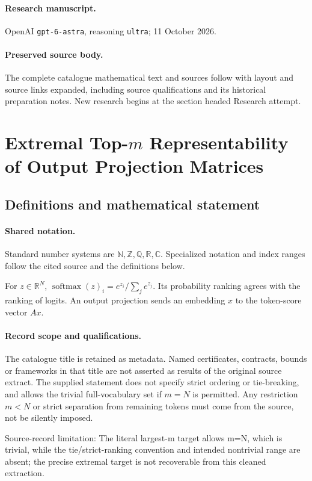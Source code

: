 \documentclass[11pt]{article}
\begin{document}
\paragraph{Research manuscript.} OpenAI \texttt{gpt-6-astra}, reasoning \texttt{ultra}; 11 October 2026.
\paragraph{Preserved source body.} The complete catalogue mathematical text and sources follow with layout and source links expanded, including source qualifications and its historical preparation notes. New research begins at the section headed Research attempt.

\section{Extremal Top-$m$ Representability of Output Projection Matrices}\label{statement}

\subsection{Definitions and mathematical statement}

\paragraph{Shared notation.}Standard number systems are $\mathbb N,\mathbb Z,\mathbb Q,\mathbb R,\mathbb C$. Specialized notation and index ranges follow the cited source and the definitions below.


For $z\in\mathbb R^N$, $\operatorname{softmax}(z)_i=e^{z_i}/\sum_j e^{z_j}$. Its probability ranking agrees with the ranking of logits. An output projection sends an embedding $x$ to the token-score vector $Ax$.
\paragraph{Record scope and qualifications.}
The catalogue title is retained as metadata. Named certificates, contracts, bounds or frameworks in that title are not asserted as results of the original source extract.
The supplied statement does not specify strict ordering or tie-breaking, and allows the trivial full-vocabulary set if $m=N$ is permitted. Any restriction $m<N$ or strict separation from remaining tokens must come from the source, not be silently imposed.

Source-record limitation: The literal largest-m target allows m=N, which is trivial, while the tie/strict-ranking convention and intended nontrivial range are absent; the precise extremal target is not recoverable from this cleaned extraction.
\end{document}
